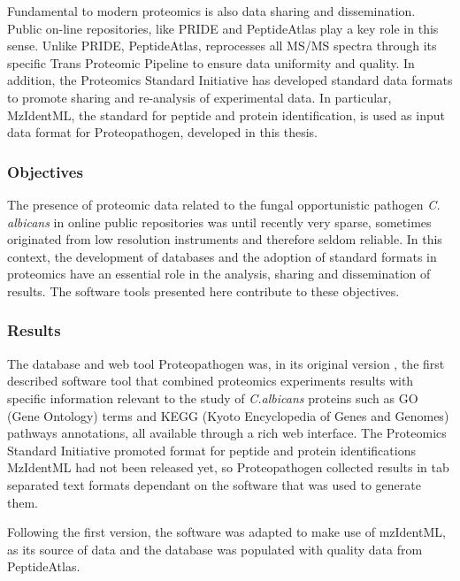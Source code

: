 Fundamental to modern proteomics is also data sharing and dissemination. 
Public on-line repositories, like PRIDE and PeptideAtlas play a key role in 
this sense. Unlike PRIDE, PeptideAtlas, reprocesses all MS/MS spectra through
its specific Trans Proteomic Pipeline to ensure data uniformity and quality.
In addition, the Proteomics Standard Initiative has developed standard data formats 
to promote sharing and re-analysis of experimental data. In particular,
MzIdentML, the standard for peptide and protein identification,
 is used as input data format for Proteopathogen, developed in this thesis.



\subsubsection*{Objectives}
The presence of proteomic data related to the fungal opportunistic 
pathogen \textit{C. albicans} in online public repositories was
until recently very sparse, sometimes originated from low resolution
instruments and therefore seldom reliable.
In this context, the development of databases and the adoption
of standard formats in proteomics have an essential role in the analysis,
sharing and dissemination of results. The software tools presented here 
contribute to these objectives.

\subsubsection*{Results}
The database and web tool Proteopathogen was, in its original version
\citep{Vialas2009b},
the first described software tool
that combined proteomics experiments results with specific information 
relevant to the study of \textit{C.albicans} proteins such as GO (Gene Ontology)
terms and KEGG (Kyoto Encyclopedia of Genes and Genomes) pathways annotations,
all available through a rich web interface.
The Proteomics Standard Initiative promoted format for peptide and protein
identifications MzIdentML had not been released yet, so Proteopathogen
collected results in tab separated text formats dependant on the software
that was used to generate them.

\medskip

Following the first version, the software was adapted to make use of
mzIdentML, as its source of data
\citep{Vialas2015} and the database was populated with quality data from PeptideAtlas.

\medskip

